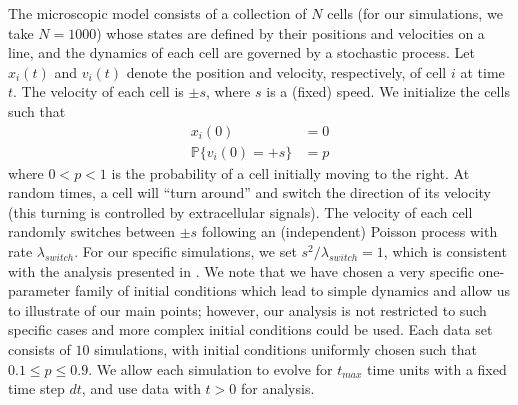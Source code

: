 The microscopic model consists of a collection of $N$ cells (for our simulations, we take $N=1000$) whose states are defined by their positions and velocities on a line, and the dynamics of each cell are governed by a stochastic process.
%
Let $x_i(t)$ and $v_i(t)$ denote the position and velocity, respectively, of cell $i$ at time $t$.
%
The velocity of each cell is $\pm s$, where $s$ is a (fixed) speed.
%
We initialize the cells such that
\begin{equation}\label{eqn:system}
\begin{aligned}
x_i(0) & = 0 \\
\mathbb{P} \{ v_i(0) = +s \} & = p
\end{aligned}
\end{equation}
where $0 < p < 1$ is the probability of a cell initially moving to the right.
%
At random times, a cell will ``turn around'' and switch the direction of its velocity (this turning is controlled by extracellular signals).
%
The velocity of each cell randomly switches between $\pm s$ following an (independent) Poisson process with rate $\lambda_{switch}$.
%
For our specific simulations, we set $s^2/\lambda_{switch}=1$, which is consistent with the analysis presented in \cite{othmer1988models}.
%
We note that we have chosen a very specific one-parameter family of initial conditions which lead to simple dynamics and allow us to illustrate of our main points;
however, our analysis is not restricted to such specific cases and more complex initial conditions could be used.
%
Each data set consists of $10$ simulations, with initial conditions uniformly chosen such that $0.1 \le p  \le 0.9$.
%
We allow each simulation to evolve for $t_{max}$ time units with a fixed time step $dt$, and use data with $t > 0$ for analysis.

